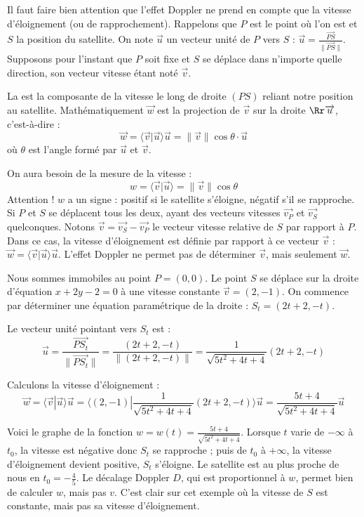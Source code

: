 \documentclass[class=report,crop=false]{standalone}
\newcommand{\vect}{\overrightarrow}
\begin{document}
Il faut faire bien attention que l'effet Doppler ne prend en compte que la vitesse
d'éloignement (ou de rapprochement).
Rappelons que $P$ est le point où l'on est et $S$ la position du satellite.
 On note $\vect u$ un vecteur unité de $P$ vers $S$ : 
 $\vect u = \frac{\vect{PS}}{\|\vect{PS}\|}$.
Supposons pour l'instant que $P$ soit fixe 
et $S$ se déplace dans n'importe quelle direction, son vecteur vitesse 
étant noté $\vect v$.

\begin{definition}
La  est la composante de la vitesse 
le long de droite $(PS)$ reliant notre position au satellite.
Mathématiquement $\vect w$ est la projection de $\vect v$ sur la droite 
$\Rr \vect u$, c'est-à-dire :
$$\vect w = \langle \vect v | \vect u \rangle \vect u = \| \vect v \| \cos \theta \cdot \vect u$$
où $\theta$ est l'angle formé par $\vect u$ et $\vect v$.  
\end{definition}


On aura besoin de la mesure de la vitesse :
$$w = \langle \vect v | \vect u \rangle = \| \vect v \| \cos \theta $$
Attention ! $w$ a un signe : positif si le satellite s'éloigne, 
négatif s'il se rapproche.
Si $P$ et $S$ se déplacent tous les deux, ayant des vecteurs vitesses
$\vect{v_P}$ et $\vect{v_S}$ quelconques. Notons $\vect v = \vect{v_S}-\vect{v_P}$ le vecteur vitesse relative de $S$ 
par rapport à $P$. Dans ce cas, la vitesse d'éloignement est définie par rapport à ce vecteur $\vect v$ :
$\vect w = \langle \vect v | \vect u \rangle \vect u$.
L'effet Doppler ne permet pas de déterminer $\vect v$, mais seulement $\vect w$.

\begin{exemple}
Nous sommes immobiles au point $P = (0,0)$. Le point 
$S$ se déplace sur la droite 
d'équation $x+2y-2=0$ à une vitesse constante
$\vect v = (2,-1)$.
On commence par déterminer une équation paramétrique de la droite : 
$S_t = (2t+2,-t)$. 

Le vecteur unité pointant vers $S_t$ est :
$$\vect u = \frac{\vect{PS_t}}{\|\vect{PS_t}\|}
= \frac{(2t+2,-t)}{\| (2t+2,-t) \|} = \frac{1}{\sqrt{5t^2+4t+4}} (2t+2,-t)$$

Calculons la vitesse d'éloignement :
$$\vect w = \langle \vect v | \vect u \rangle \vect u
= \bigg\langle (2,-1) | \frac{1}{\sqrt{5t^2+4t+4}} (2t+2,-t) \bigg\rangle \vect u
= \frac{5t+4}{\sqrt{5t^2+4t+4}} \vect u$$

Voici le graphe de la fonction $w = w(t) = \frac{5t+4}{\sqrt{5t^2+4t+4}}$.
Lorsque $t$ varie de $-\infty$ à $t_0$, la vitesse est négative donc
$S_t$ se rapproche ; puis de $t_0$ à $+\infty$, la vitesse d'éloignement devient positive,
$S_t$ s'éloigne. Le satellite est au plus proche de nous en $t_0 = -\frac{4}{5}$.
Le décalage Doppler $D$, qui est proportionnel à $w$, permet bien de calculer
$w$, mais pas $v$. C'est clair sur cet exemple où la vitesse de $S$ est constante,
mais pas sa vitesse d'éloignement.
\end{exemple}
\end{document}
